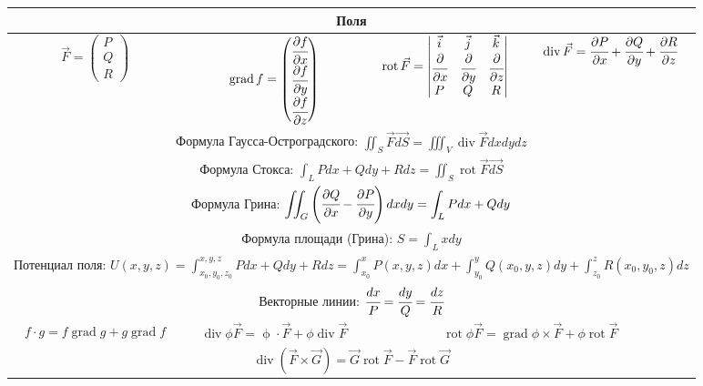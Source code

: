 
\begin{tabular}{c|c|c|c}
	\multicolumn{4}{c}{Поля} \\
	\hline
$\displaystyle \vec{F} = \left(\begin{matrix}
P \\ Q \\ R
\end{matrix}\right)$ &

$\displaystyle \operatorname{grad} f = \left(
\begin{matrix}
\cfrac{\partial f}{\partial x} \\ \cfrac{\partial f}{\partial y} \\
\cfrac{\partial f}{\partial z}
\end{matrix}
\right)$

&

$\displaystyle \operatorname{rot} \vec{F} =
\begin{vmatrix}
\vec{i} & \vec{j} & \vec{k} \\
\cfrac{\partial}{\partial x} & \cfrac{\partial}{\partial y} &
\cfrac{\partial}{\partial z} \\
P & Q & R
\end{vmatrix}
$
&
$\displaystyle \operatorname{div}\vec{F} = \cfrac{\partial P}{\partial x} + \cfrac{\partial Q}{\partial y} +
\cfrac{\partial R}{\partial z}$ \\
\hline

\multicolumn{4}{c}{Формула Гаусса-Остроградского: $\displaystyle\iint_S \vec{F}\vec{dS} = \iiint_V \operatorname{div}\vec{F}dxdydz$} \\


\multicolumn{4}{c}{Формула Стокса: $\displaystyle \int_L Pdx + Qdy + Rdz = \iint_S \operatorname{rot}\vec{F} \vec{dS}$} \\

\multicolumn{4}{c}{Формула Грина: $\displaystyle \iint_G \left(\cfrac{\partial Q}{\partial x} - \cfrac{\partial P}{\partial y}\right)dxdy = 
	\int_L Pdx+Qdy$} \\

\multicolumn{4}{c}{Формула площади (Грина): $
	S = \int_L xdy
	$} \\

\hline 
\multicolumn{4}{c}{Потенциал поля: $\displaystyle
	U(x,y,z) = \int_{x_0, y_0, z_0}^{x,y,z} Pdx+Qdy+Rdz =
	\int_{x_0}^{x} P(x,y,z)dx + \int_{y_0}^{y}Q(x_0,y,z)dy +
	\int_{z_0}^{z} R(x_0,y_0,z)dz
	$}\\

\multicolumn{4}{c}{Векторные линии: $
	\cfrac{dx}{P} = \cfrac{dy}{Q} = \cfrac{dz}{R}
	$}
\\

$\displaystyle f\cdot g = f\operatorname{grad}g + g\operatorname{grad}f$ & 
$\displaystyle \operatorname{div}\phi \vec{F} = \operatorname{\phi}\cdot \vec{F} + \phi \operatorname{div}\vec{F}$
& \multicolumn{2}{c}{$\displaystyle \operatorname{rot}\phi \vec{F} =
\operatorname{grad}\phi \times \vec{F} + \phi \operatorname{rot} \vec{F}$}
\\
\multicolumn{4}{c}{
$\displaystyle \operatorname{div}(\vec{F}\times\vec{G}) = \vec{G} \operatorname{rot}\vec{F} - \vec{F}\operatorname{rot}\vec{G}$}\\
\hline
\end{tabular} 